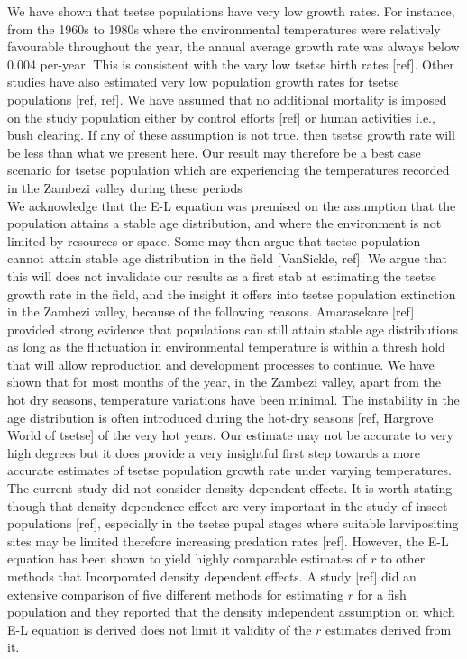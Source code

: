 \documentclass[10pt,a4paper]{article}
\begin{document}
We have shown that tsetse populations have very low growth rates. For instance, from the 1960s to 1980s where the environmental temperatures were relatively favourable throughout the year, the annual average growth rate was always below 0.004 per-year. This is consistent with the vary low tsetse birth rates [ref]. Other studies have also estimated very low population growth rates for tsetse populations [ref, ref]. We have assumed that no additional mortality is imposed on the study population either by control efforts [ref] or human activities i.e., bush clearing. If any of these assumption is not true, then tsetse growth rate will be less than what we present here. Our result may therefore be a best case scenario for tsetse population which are experiencing the temperatures recorded in the Zambezi valley during these periods \\


We acknowledge that the E-L equation was premised on the assumption that the population attains a stable age distribution, and where the environment is not limited by resources or space. Some may then argue that tsetse population cannot attain stable age distribution in the field [VanSickle, ref]. We argue that this will does not invalidate our results as a first stab at estimating the tsetse growth rate in the field, and the insight it offers into tsetse population extinction in the Zambezi valley,  because of the following reasons. Amarasekare [ref] provided strong evidence that populations can still attain stable age distributions as long as the fluctuation in environmental temperature is within a thresh hold that will allow reproduction and development processes to continue. We have shown that for most months of the year, in the Zambezi valley, apart from the hot dry seasons, temperature variations have been minimal. The instability in the age distribution is often introduced during the hot-dry seasons [ref, Hargrove World of tsetse] of the very hot years. Our estimate may not be accurate to very high degrees but it does provide a very insightful first step towards a more accurate estimates of tsetse population growth rate under varying temperatures.  \\

The current study did not consider density dependent effects. It is worth stating though that density dependence effect are very important in the study of insect populations [ref], especially in the tsetse pupal stages where suitable larvipositing sites may be limited therefore increasing predation rates [ref]. However, the E-L equation has been shown to yield highly comparable estimates of $r$ to other methods that Incorporated density dependent effects. A study [ref] did an extensive comparison of five different methods for estimating $r$ for a fish population and they reported that the density independent assumption on which E-L equation is derived does not limit it validity of the $r$ estimates derived from it.    \\
\end{document}
